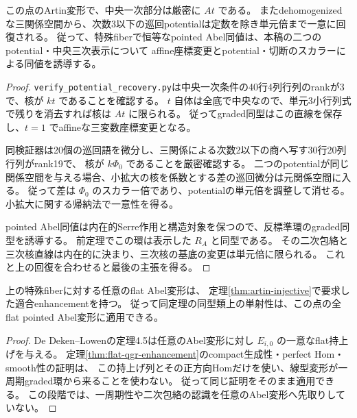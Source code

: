 \begin{lemma}[potentialと中央一次直線の形式的回復]\label{lem:potential-recovery}
この点のArtin変形で、中央一次部分は厳密に $At$ である。
またdehomogenizedな三関係空間から、次数3以下の巡回potentialは定数を除き単元倍まで一意に回復される。
従って、特殊fiberで恒等なpointed Abel同値は、本稿の二つのpotential・中央三次表示について
affine座標変更とpotential・切断のスカラーによる同値を誘導する。
\end{lemma}
\begin{proof}
\texttt{verify\_potential\_recovery.py}は中央一次条件の40行4列行列のrankが3で、核が $kt$ であることを確認する。
$t$ 自体は全底で中央なので、単元3小行列式で残りを消去すれば核は $At$ に限られる。
従ってgraded同型はこの直線を保存し、$t=1$ でaffineな三変数座標変更となる。

同検証器は20個の巡回語を微分し、三関係による次数2以下の商へ写す30行20列行列がrank19で、
核が $k\Phi_0$ であることを厳密確認する。
二つのpotentialが同じ関係空間を与える場合、小拡大の核を係数とする差の巡回微分は元関係空間に入る。
従って差は $\Phi_0$ のスカラー倍であり、potentialの単元倍を調整して消せる。
小拡大に関する帰納法で一意性を得る。

pointed Abel同値は内在的Serre作用と構造対象を保つので、反標準環のgraded同型を誘導する。
前定理でこの環は表示した $R_A$ と同型である。
その二次包絡と三次核直線は内在的に決まり、三次核の基底の変更は単元倍に限られる。
これと上の回復を合わせると最後の主張を得る。
\end{proof}

\begin{corollary}[任意のAbel変形に対する適合enhancement]\label{cor:any-abel-enhanced}
上の特殊fiberに対する任意のflat Abel変形は、
定理\ref{thm:artin-injective}で要求した適合enhancementを持つ。
従って同定理の同型類上の単射性は、この点の全flat pointed Abel変形に適用できる。
\end{corollary}
\begin{proof}
De Deken--Lowenの定理4.5は任意のAbel変形に対し $E_{i,0}$ の一意なflat持上げを与える。
定理\ref{thm:flat-qgr-enhancement}のcompact生成性・perfect Hom・smooth性の証明は、
この持上げ列とその正方向Homだけを使い、線型変形が一周期graded環から来ることを使わない。
従って同じ証明をそのまま適用できる。
この段階では、一周期性や二次包絡の認識を任意のAbel変形へ先取りしていない。
\end{proof}

